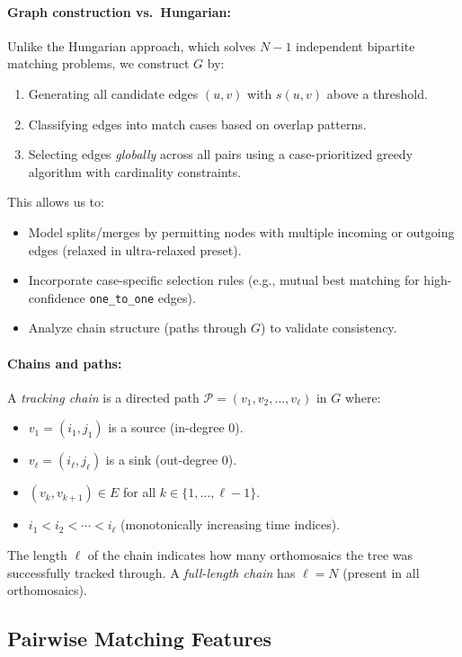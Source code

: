 \paragraph{Graph construction vs.\ Hungarian:} Unlike the Hungarian approach, which solves $N-1$ independent bipartite matching problems, we construct $G$ by:
\begin{enumerate}
    \item Generating all candidate edges $(u,v)$ with $s(u,v)$ above a threshold.
    \item Classifying edges into match cases based on overlap patterns.
    \item Selecting edges \emph{globally} across all pairs using a case-prioritized greedy algorithm with cardinality constraints.
\end{enumerate}
This allows us to:
\begin{itemize}
    \item Model splits/merges by permitting nodes with multiple incoming or outgoing edges (relaxed in ultra-relaxed preset).
    \item Incorporate case-specific selection rules (e.g., mutual best matching for high-confidence \texttt{one\_to\_one} edges).
    \item Analyze chain structure (paths through $G$) to validate consistency.
\end{itemize}

\paragraph{Chains and paths:} A \emph{tracking chain} is a directed path $\mathcal{P} = (v_1, v_2, \ldots, v_\ell)$ in $G$ where:
\begin{itemize}
    \item $v_1 = (i_1, j_1)$ is a source (in-degree 0).
    \item $v_\ell = (i_\ell, j_\ell)$ is a sink (out-degree 0).
    \item $(v_k, v_{k+1}) \in E$ for all $k \in \{1, \ldots, \ell-1\}$.
    \item $i_1 < i_2 < \cdots < i_\ell$ (monotonically increasing time indices).
\end{itemize}
The length $\ell$ of the chain indicates how many orthomosaics the tree was successfully tracked through. A \emph{full-length chain} has $\ell = N$ (present in all orthomosaics).

\subsection{Pairwise Matching Features}
\label{sec:pairwise_features}

